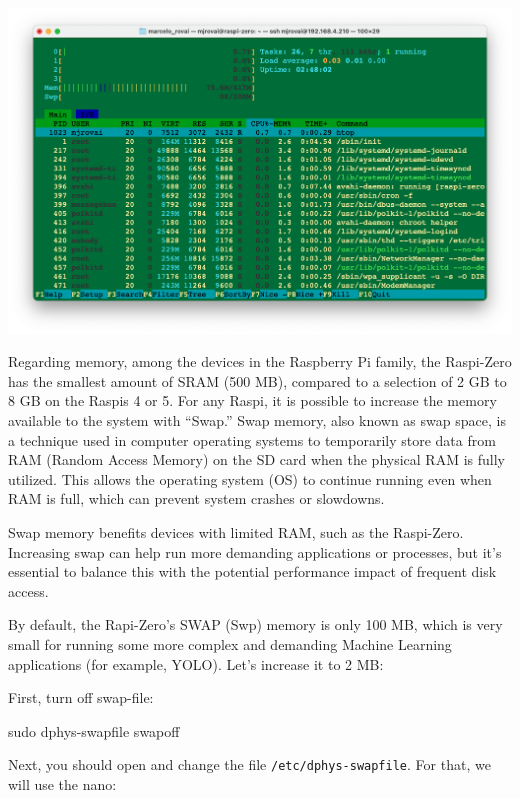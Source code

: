 \documentclass[
]{article}
\newenvironment{Shaded}{\begin{snugshade}}{\end{snugshade}}
\newcommand{\FunctionTok}[1]{\textcolor[rgb]{0.28,0.35,0.67}{#1}}
\newcommand{\NormalTok}[1]{\textcolor[rgb]{0.00,0.23,0.31}{#1}}
\begin{document}
\noindent \begin{center}
\includegraphics[width=0.8\linewidth,height=\textheight,keepaspectratio]{images/png/htop.png}
\end{center}

Regarding memory, among the devices in the Raspberry Pi family, the
Raspi-Zero has the smallest amount of SRAM (500 MB), compared to a
selection of 2 GB to 8 GB on the Raspis 4 or 5. For any Raspi, it is
possible to increase the memory available to the system with ``Swap.''
Swap memory, also known as swap space, is a technique used in computer
operating systems to temporarily store data from RAM (Random Access
Memory) on the SD card when the physical RAM is fully utilized. This
allows the operating system (OS) to continue running even when RAM is
full, which can prevent system crashes or slowdowns.

Swap memory benefits devices with limited RAM, such as the Raspi-Zero.
Increasing swap can help run more demanding applications or processes,
but it's essential to balance this with the potential performance impact
of frequent disk access.

By default, the Rapi-Zero's SWAP (Swp) memory is only 100 MB, which is
very small for running some more complex and demanding Machine Learning
applications (for example, YOLO). Let's increase it to 2 MB:

First, turn off swap-file:

\begin{Shaded}
\begin{Highlighting}[]
\FunctionTok{sudo}\NormalTok{ dphys{-}swapfile swapoff}
\end{Highlighting}
\end{Shaded}

Next, you should open and change the file \texttt{/etc/dphys-swapfile}.
For that, we will use the nano:
\end{document}
